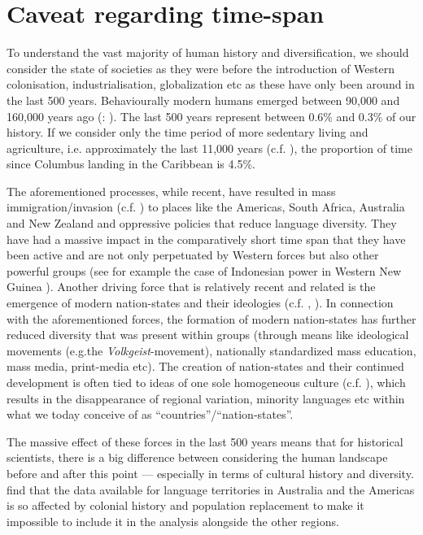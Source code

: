 \documentclass[12pt,letterpaper]{article}
\begin{document}
\newpage

\section{Caveat regarding time-span}
\label{appendix_time_span}

To understand the vast majority of human history and diversification, we should consider the state of societies as they were before the introduction of Western colonisation, industrialisation, globalization etc as these have only been around in the last 500 years. Behaviourally modern humans emerged between 90,000 and 160,000 years ago (\citet{powell2009late}: \cite{marean2007early}). The last 500 years represent between 0.6\% and 0.3\% of our history. If we consider only the time period of more sedentary living and agriculture, i.e. approximately the last 11,000 years (c.f. \citet{kislev2006early}), the proportion of time since Columbus landing in the Caribbean is 4.5\%.

The aforementioned processes, while recent, have resulted in mass immigration/invasion (c.f. \citet{invasion_day}) to places like the Americas, South Africa, Australia and New Zealand and oppressive policies that reduce language diversity. They have had a massive impact in the comparatively short time span that they have been active and are not only perpetuated by Western forces but also other powerful groups (see for example the case of Indonesian power in Western New Guinea \citep{gietzelt1989indonesianization}). Another driving force that is relatively recent and related is the emergence of modern nation-states and their ideologies (c.f. \citet{foucault2007security}, \citet[21-22]{oakes2001language}). In connection with the aforementioned forces, the formation of modern nation-states has further reduced diversity that was present within groups (through means like ideological movements (e.g.the \emph{Volkgeist}-movement), nationally standardized mass education, mass media, print-media etc). The creation of nation-states and their continued development is often tied to ideas of one sole homogeneous culture (c.f. \citet{encyclo_nationalism}), which results in the disappearance of regional variation, minority languages etc within what we today conceive of as ``countries''/``nation-states''. 

The massive effect of these forces in the last 500 years means that for historical scientists, there is a big difference between considering the human landscape before and after this point --- especially in terms of cultural history and diversity. \citet[7340-7341]{curriemace2009} find that the data available for language territories in Australia and the Americas is so affected by colonial history and population replacement to make it impossible to include it in the analysis alongside the other regions. 
\end{document}
